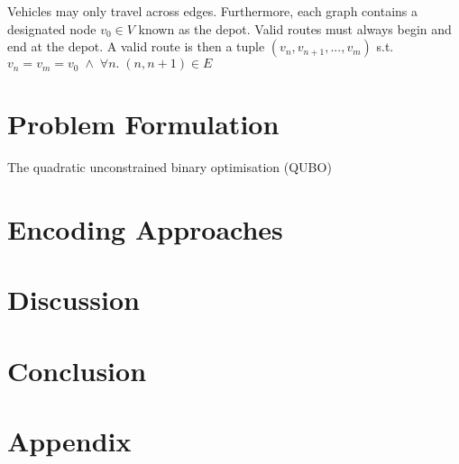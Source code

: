\documentclass {article}
\begin{document}
Vehicles may only travel across edges. Furthermore, each graph contains a
designated node $v_0 \in V$ known as the depot. Valid routes must always
begin and end at the depot. A valid route is then a tuple
$(v_n, v_{n+1}, ..., v_m)$ s.t.
$v_n = v_m = v_0 \; \land \; \forall n. \; (n, n{+}1) \in E$


\section {Problem Formulation}
The quadratic unconstrained binary optimisation (QUBO) 

\section {Encoding Approaches}

\section {Discussion}

\section {Conclusion}

\section {Appendix}
\end{document}
